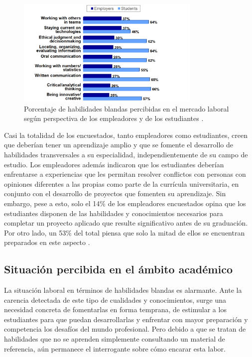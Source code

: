 \documentclass[conference]{IEEEtran}
\begin{document}
\begin{figure}[htbp]
\centering
\includegraphics[width=250pt,height=147pt]{encuesta.png}
\caption{Porcentaje de habilidades blandas percibidas en el mercado laboral según perspectiva de los empleadores y de los estudiantes \cite{b9}.}
\label{fig:contexto_laboral}
\end{figure}

Casi la totalidad de los encuestados, tanto empleadores como estudiantes, creen que deberían tener un aprendizaje amplio y que se fomente el desarrollo de habilidades transversales a su especialidad, independientemente de su campo de estudio. Los empleadores además indicaron que los estudiantes deberían enfrentarse a experiencias que les permitan resolver conflictos con personas con opiniones diferentes a las propias \cite{b9} como parte de la currícula universitaria, en conjunto con el desarrollo de proyectos que fomenten su aprendizaje. Sin embargo, pese a esto, solo el 14\% de los empleadores encuestados opina que los estudiantes disponen de las habilidades y conocimientos necesarios para completar un proyecto aplicado que resulte significativo antes de su graduación. Por otro lado, un 53\% del total piensa que solo la mitad de ellos se encuentran preparados en este aspecto \cite{b9}.



\subsection{Situación percibida en el ámbito académico}
\label{scrivauto:14}

La situación laboral en términos de habilidades blandas es alarmante. Ante la carencia detectada de este tipo de cualidades y conocimientos, surge una necesidad concreta de fomentarlas en forma temprana, de estimular a los estudiantes para que puedan desarrollarlas y enfrentar con mayor preparación y competencia los desafíos del mundo profesional. Pero debido a que se tratan de habilidades que no se aprenden simplemente consultando un material de referencia, aún permanece el interrogante sobre cómo encarar esta labor.
\end{document}

